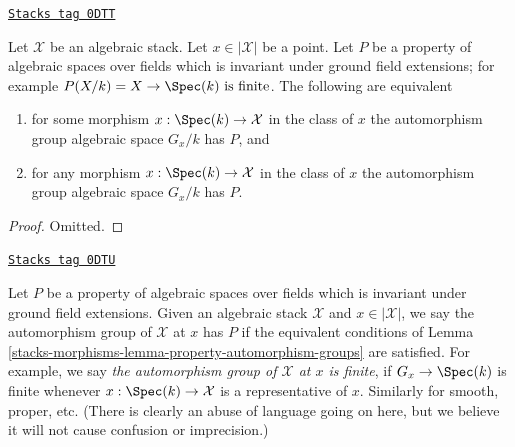 \begin{lemma}
\label{stacks-morphisms-lemma-property-automorphism-groups}
\href{https://stacks.math.columbia.edu/tag/0DTT}{\texttt{Stacks tag 0DTT}}

Let $\mathcal{X}$ be an algebraic stack. Let $x \in |\mathcal{X}|$ be a point.
Let $P$ be a property of algebraic spaces over fields which is invariant
under ground field extensions; for example
$P(X/k) = X \to \Spec(k)\text{ is finite}$.
The following are equivalent
\begin{enumerate}
\item for some morphism $x : \Spec(k) \to \mathcal{X}$ in the
class of $x$ the automorphism group algebraic space $G_x/k$
has $P$, and
\item for any morphism $x : \Spec(k) \to \mathcal{X}$ in the
class of $x$ the automorphism group algebraic space $G_x/k$
has $P$.
\end{enumerate}
\end{lemma}

\begin{proof}
Omitted.
\end{proof}

\begin{remark}
\label{stacks-morphisms-remark-property-automorphism-groups}
\href{https://stacks.math.columbia.edu/tag/0DTU}{\texttt{Stacks tag 0DTU}}

Let $P$ be a property of algebraic spaces over fields which is invariant
under ground field extensions. Given an algebraic stack $\mathcal{X}$
and $x \in |\mathcal{X}|$, we say the automorphism group of $\mathcal{X}$
at $x$ has $P$ if the equivalent conditions of
Lemma \ref{stacks-morphisms-lemma-property-automorphism-groups} are satisfied.
For example, we say {\it the automorphism group of $\mathcal{X}$
at $x$ is finite}, if $G_x \to \Spec(k)$ is finite whenever
$x : \Spec(k) \to \mathcal{X}$ is a representative of $x$.
Similarly for smooth, proper, etc.
(There is clearly an abuse of language going on here, but we
believe it will not cause confusion or imprecision.)
\end{remark}

